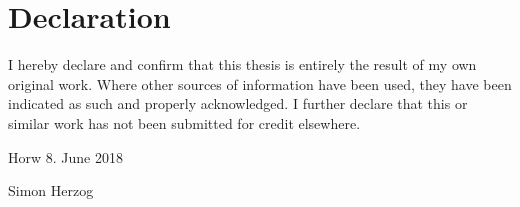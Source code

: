 \chapter*{Declaration}

I hereby declare and confirm that this thesis is entirely the result of my own original work. 
Where other sources of information have been used, they have been indicated as such and properly 
acknowledged. I further declare that this or similar work has not been submitted for credit elsewhere.

\vspace{15mm}

Horw \hspace{3mm} 8. June 2018

\vspace{15mm}

Simon Herzog